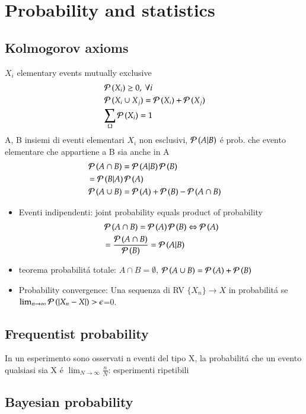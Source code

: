 \documentclass[main.tex]{subfiles}
\begin{document}
\chapter{Probability and statistics}

\section{Kolmogorov axioms}
$X_i$ elementary events mutually exclusive
\begin{align*}
&\operatorname{\mathcal{P}}{(X_i)}\geq0,\ \forall i\\
&\operatorname{\mathcal{P}}{(X_i\cup X_j)}=\operatorname{\mathcal{P}}{(X_i)}+\operatorname{\mathcal{P}}{(X_j)}\\
&\sum_{\Omega}\operatorname{\mathcal{P}}{(X_i)}=1
\end{align*}
A, B insiemi di eventi elementari $X_i$ non esclusivi, $\operatorname{\mathcal{P}}{(A|B)}$ \'e prob. che evento elementare che appartiene a B sia anche in A
\begin{align*}
&\operatorname{\mathcal{P}}{(A\cap B)}=\operatorname{\mathcal{P}}{(A|B)}\operatorname{\mathcal{P}}{(B)}\\
&=\operatorname{\mathcal{P}}{(B|A)}\operatorname{\mathcal{P}}{(A)}\\
&\operatorname{\mathcal{P}}{(A\cup B)}=\operatorname{\mathcal{P}}{(A)}+\operatorname{\mathcal{P}}{(B)}-\operatorname{\mathcal{P}}{(A\cap B)} 
\end{align*}
\begin{itemize}
\item Eventi indipendenti: joint probability equals product of probability
\begin{align*}
&\operatorname{\mathcal{P}}{(A\cap B)}=\operatorname{\mathcal{P}}{(A)}\operatorname{\mathcal{P}}{(B)}\Leftrightarrow \operatorname{\mathcal{P}}{(A)}\\
&=\frac{\operatorname{\mathcal{P}}{(A\cap B)}}{\operatorname{\mathcal{P}}{(B)}}=\operatorname{\mathcal{P}}{(A|B)}
\end{align*}
\item teorema probabilit\'a totale: $A\cap B=\emptyset$, $\operatorname{\mathcal{P}}{(A\cup B)}=\operatorname{\mathcal{P}}{(A)}+\operatorname{\mathcal{P}}{(B)}$
\item Probability convergence: Una sequenza di RV $\{X_n\}\to X$ in probabilit\'a se $\lim_{n\to\infty}\operatorname{\mathcal{P}}{(|X_n-X|)>\epsilon}$=0.
\end{itemize}

\section{Frequentist probability}

In un esperimento sono osservati n eventi del tipo X, la probabilit\'a che un evento qualsiasi sia X \'e $\lim_{N\to\infty}\frac{n}{N}$: esperimenti ripetibili

\section{Bayesian probability}
\end{document}

